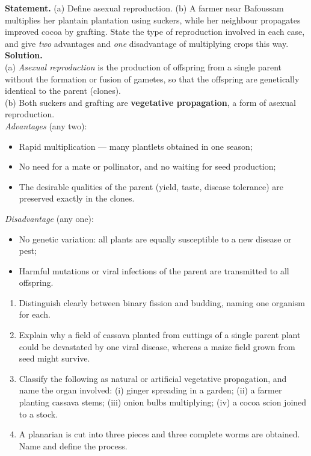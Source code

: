 \documentclass[11pt]{article}
\begin{document}
\begin{exoresolu}
\textbf{Statement.} (a) Define asexual reproduction. (b) A farmer near Bafoussam multiplies her plantain plantation using suckers, while her neighbour propagates improved cocoa by grafting. State the type of reproduction involved in each case, and give \emph{two} advantages and \emph{one} disadvantage of multiplying crops this way.
\tcblower
\textbf{Solution.}\\
(a) \emph{Asexual reproduction} is the production of offspring from a single parent without the formation or fusion of gametes, so that the offspring are genetically identical to the parent (clones).\\[4pt]
(b) Both suckers and grafting are \textbf{vegetative propagation}, a form of asexual reproduction.\\
\emph{Advantages} (any two):
\begin{itemize}
\item Rapid multiplication --- many plantlets obtained in one season;
\item No need for a mate or pollinator, and no waiting for seed production;
\item The desirable qualities of the parent (yield, taste, disease tolerance) are preserved exactly in the clones.
\end{itemize}
\emph{Disadvantage} (any one):
\begin{itemize}
\item No genetic variation: all plants are equally susceptible to a new disease or pest;
\item Harmful mutations or viral infections of the parent are transmitted to all offspring.
\end{itemize}
\end{exoresolu}

\begin{exercice}
\begin{enumerate}
\item Distinguish clearly between binary fission and budding, naming one organism for each.
\item Explain why a field of cassava planted from cuttings of a single parent plant could be devastated by one viral disease, whereas a maize field grown from seed might survive.
\item Classify the following as natural or artificial vegetative propagation, and name the organ involved: (i) ginger spreading in a garden; (ii) a farmer planting cassava stems; (iii) onion bulbs multiplying; (iv) a cocoa scion joined to a stock.
\item A planarian is cut into three pieces and three complete worms are obtained. Name and define the process.
\end{enumerate}
\end{exercice}
\end{document}
